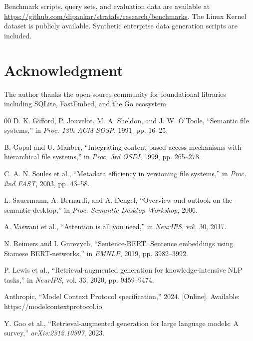 \documentclass[conference]{IEEEtran}
\begin{document}
Benchmark scripts, query sets, and evaluation data are available at \url{https://github.com/dipankar/stratafs/research/benchmarks}. The Linux Kernel dataset is publicly available. Synthetic enterprise data generation scripts are included.

\section*{Acknowledgment}

The author thanks the open-source community for foundational libraries including SQLite, FastEmbed, and the Go ecosystem.

\begin{thebibliography}{00}
 D. K. Gifford, P. Jouvelot, M. A. Sheldon, and J. W. O'Toole, ``Semantic file systems,'' in \textit{Proc. 13th ACM SOSP}, 1991, pp. 16--25.

 B. Gopal and U. Manber, ``Integrating content-based access mechanisms with hierarchical file systems,'' in \textit{Proc. 3rd OSDI}, 1999, pp. 265--278.

 C. A. N. Soules et al., ``Metadata efficiency in versioning file systems,'' in \textit{Proc. 2nd FAST}, 2003, pp. 43--58.

 L. Sauermann, A. Bernardi, and A. Dengel, ``Overview and outlook on the semantic desktop,'' in \textit{Proc. Semantic Desktop Workshop}, 2006.

 A. Vaswani et al., ``Attention is all you need,'' in \textit{NeurIPS}, vol. 30, 2017.

 N. Reimers and I. Gurevych, ``Sentence-BERT: Sentence embeddings using Siamese BERT-networks,'' in \textit{EMNLP}, 2019, pp. 3982--3992.

 P. Lewis et al., ``Retrieval-augmented generation for knowledge-intensive NLP tasks,'' in \textit{NeurIPS}, vol. 33, 2020, pp. 9459--9474.

 Anthropic, ``Model Context Protocol specification,'' 2024. [Online]. Available: https://modelcontextprotocol.io

 Y. Gao et al., ``Retrieval-augmented generation for large language models: A survey,'' \textit{arXiv:2312.10997}, 2023.
\end{thebibliography}
\end{document}
